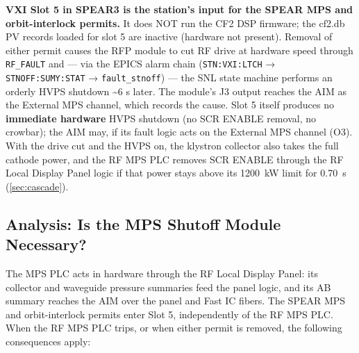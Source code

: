 \begin{keynote}
\textbf{VXI Slot 5 in SPEAR3 is the station's input for the SPEAR MPS and orbit-interlock permits.} It does NOT run the CF2 DSP firmware; the cf2.db PV records loaded for slot 5 are inactive (hardware not present). Removal of either permit causes the RFP module to cut RF drive at hardware speed through \texttt{RF\_FAULT} and --- via the EPICS alarm chain (\texttt{STN:VXI:LTCH} → \texttt{STNOFF:\allowbreak{}SUMY:\allowbreak{}STAT} → \texttt{fault\_stnoff}) --- the SNL state machine performs an orderly HVPS shutdown \textasciitilde6 s later. The module's J3 output reaches the AIM as the External MPS channel, which records the cause. Slot 5 itself produces no \textbf{immediate hardware} HVPS shutdown (no SCR ENABLE removal, no crowbar); the AIM may, if its fault logic acts on the External MPS channel (O3). With the drive cut and the HVPS on, the klystron collector also takes the full cathode power, and the RF MPS PLC removes SCR ENABLE through the RF Local Display Panel logic if that power stays above its \qty{1200}{\kilo\watt} limit for \qty{0.70}{\second} (\cref{sec:cascade}).
\end{keynote}

\subsection{Analysis: Is the MPS Shutoff Module Necessary?}\label{sec:slot5-analysis}


The MPS PLC acts in hardware through the RF Local Display Panel: its collector and waveguide pressure summaries feed the panel logic, and its AB summary reaches the AIM over the panel and Fast IC fibers. The SPEAR MPS and orbit-interlock permits enter Slot 5, independently of the RF MPS PLC. When the RF MPS PLC trips, or when either permit is removed, the following consequences apply:

